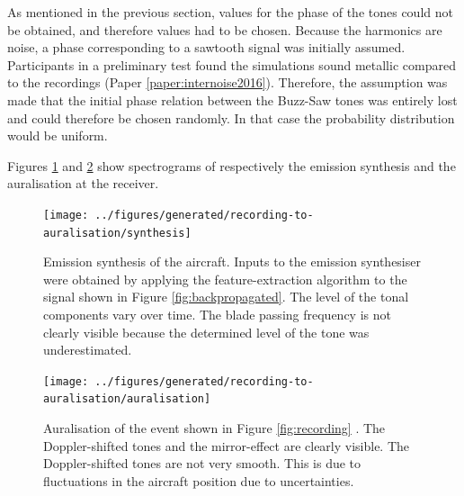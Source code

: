 As mentioned in the previous section, values for the phase of the tones could
not be obtained, and therefore values had to be chosen. Because the harmonics
are  noise, a phase corresponding to a sawtooth signal was
initially assumed. Participants in a preliminary test found the simulations
sound metallic compared to the recordings (Paper \ref{paper:internoise2016}). Therefore, the
assumption was made that the initial phase relation between the Buzz-Saw tones
was entirely lost and could therefore be chosen randomly. In that case the
probability distribution would be uniform.

Figures \ref{fig:synthesis} and \ref{fig:auralisation} show spectrograms of
respectively the emission synthesis and the auralisation at the receiver.

\newpage
\begin{figure}[H]
  \centering
  \texttt{[image: ../figures/generated/recording-to-auralisation/synthesis]}
  \caption{Emission synthesis of the aircraft. Inputs to the emission synthesiser were obtained by applying the feature-extraction algorithm to the signal shown in Figure \ref{fig:backpropagated}. The level of the tonal components vary over time. The blade passing frequency is not clearly visible because the determined level of the tone was underestimated.}
  \label{fig:synthesis}
\end{figure}


\begin{figure}[H]
  \centering
  \texttt{[image: ../figures/generated/recording-to-auralisation/auralisation]}
  \caption{Auralisation of the event shown in Figure \ref{fig:recording} .
  The Doppler-shifted tones and the mirror-effect are clearly visible. The Doppler-shifted tones are not very smooth. This is due to fluctuations in the aircraft position due to uncertainties.}
  \label{fig:auralisation}
\end{figure}

